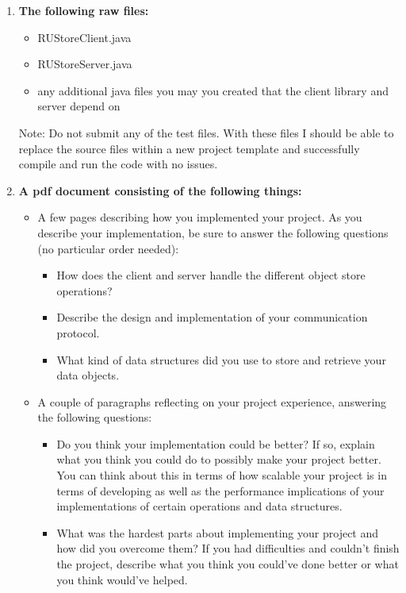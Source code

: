 \documentclass{article}
\begin{document}
\begin{enumerate}
\item \textbf{The following raw files:}
    \begin{itemize}
        \item RUStoreClient.java
        \item RUStoreServer.java
        \item any additional java files you may you created that the client library and server depend on
    \end{itemize}
    Note: Do not submit any of the test files. 
    With these files I should be able to replace the source files within a new project template and successfully compile and run the code with no issues. 
\item \textbf{A pdf document consisting of the following things:}
	\begin{itemize}
	\item A few pages describing how you implemented your project. As you describe your implementation, be sure to answer the following questions (no particular order needed):
	\begin{itemize}
	    \item How does the client and server handle the different object store operations?
	    \item Describe the design and implementation of your communication protocol.
	    \item What kind of data structures did you use to store and retrieve your data objects.
	\end{itemize}
	\item A couple of paragraphs reflecting on your project experience, answering the following questions:
	\begin{itemize}
	    \item Do you think your implementation could be better? If so, explain what you think you could do to possibly make your project better. You can think about this in terms of how scalable your project is in terms of developing as well as the performance implications of your implementations of certain operations and data structures.
	    \item What was the hardest parts about implementing your project and how did you overcome them? If you had difficulties and couldn't finish the project, describe what you think you could've done better or what you think would've helped. 
	\end{itemize}
	\end{itemize}
\end{enumerate}
\end{document}
